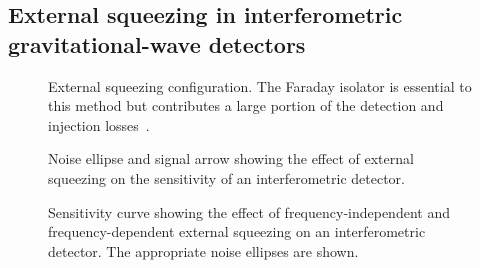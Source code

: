 \subsection{External squeezing in interferometric gravitational-wave detectors}
\label{sec:external_squeezing}

\begin{figure}
	\centering
	\caption{External squeezing configuration. The Faraday isolator is essential to this method but contributes a large portion of the detection and injection losses~\cite{}.}
	\label{fig:extSqz_config}
\end{figure}

\begin{figure}
	\centering
	\caption{Noise ellipse and signal arrow showing the effect of external squeezing on the sensitivity of an interferometric detector.}
	\label{fig:extSqz_ellipse_arrow}
\end{figure}

\begin{figure}
	\centering
	\caption{Sensitivity curve showing the effect of frequency-independent and frequency-dependent external squeezing on an interferometric detector. The appropriate noise ellipses are shown.}
	\label{fig:extSqz_sensitivity}
\end{figure}


